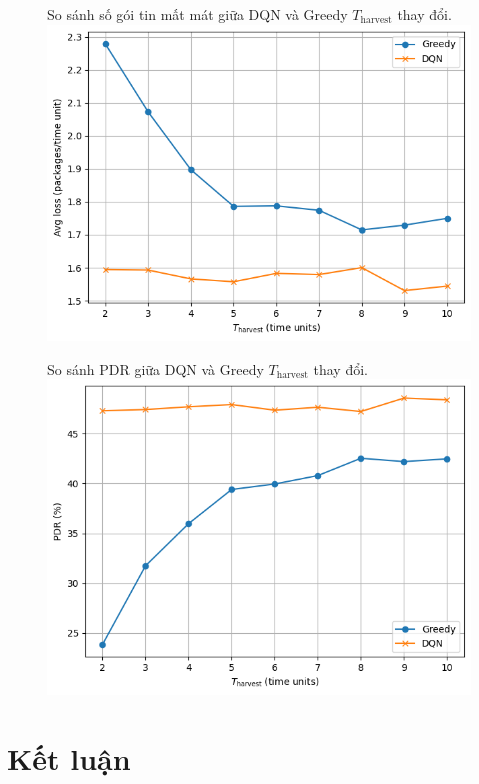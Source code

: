 \documentclass{uetgraduation}
\begin{document}
\begin{enumerate}
\begin{figure}{So sánh số gói tin mất mát giữa DQN và Greedy $T_\text{harvest}$ thay đổi.}
        \includegraphics[scale=0.5]{t_harvest_loss.png}
        \label{fig:t_loss}
    \end{figure}
    \begin{figure}{So sánh PDR giữa DQN và Greedy $T_\text{harvest}$ thay đổi.}
        \centering
        \includegraphics[scale=0.5]{t_harvest_pdr.png}
        \label{fig:t_pdr}
    \end{figure}

\end{enumerate}
\chapter{Kết luận}
\end{document}
